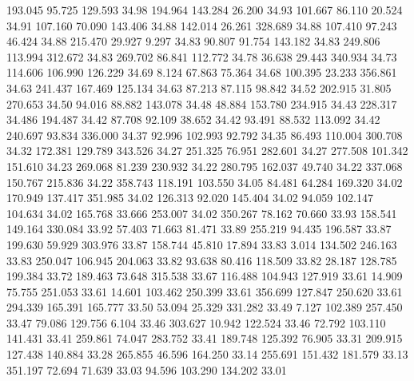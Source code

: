  193.045   95.725  129.593        34.98
 194.964  143.284   26.200        34.93
 101.667   86.110   20.524        34.91
 107.160   70.090  143.406        34.88
 142.014   26.261  328.689        34.88
 107.410   97.243   46.424        34.88
 215.470   29.927    9.297        34.83
  90.807   91.754  143.182        34.83
 249.806  113.994  312.672        34.83
 269.702   86.841  112.772        34.78
  36.638   29.443  340.934        34.73
 114.606  106.990  126.229        34.69
   8.124   67.863   75.364        34.68
 100.395   23.233  356.861        34.63
 241.437  167.469  125.134        34.63
  87.213   87.115   98.842        34.52
 202.915   31.805  270.653        34.50
  94.016   88.882  143.078        34.48
  48.884  153.780  234.915        34.43
 228.317   34.486  194.487        34.42
  87.708   92.109   38.652        34.42
  93.491   88.532  113.092        34.42
 240.697   93.834  336.000        34.37
  92.996  102.993   92.792        34.35
  86.493  110.004  300.708        34.32
 172.381  129.789  343.526        34.27
 251.325   76.951  282.601        34.27
 277.508  101.342  151.610        34.23
 269.068   81.239  230.932        34.22
 280.795  162.037   49.740        34.22
 337.068  150.767  215.836        34.22
 358.743  118.191  103.550        34.05
  84.481   64.284  169.320        34.02
 170.949  137.417  351.985        34.02
 126.313   92.020  145.404        34.02
  94.059  102.147  104.634        34.02
 165.768   33.666  253.007        34.02
 350.267   78.162   70.660        33.93
 158.541  149.164  330.084        33.92
  57.403   71.663   81.471        33.89
 255.219   94.435  196.587        33.87
 199.630   59.929  303.976        33.87
 158.744   45.810   17.894        33.83
   3.014  134.502  246.163        33.83
 250.047  106.945  204.063        33.82
  93.638   80.416  118.509        33.82
  28.187  128.785  199.384        33.72
 189.463   73.648  315.538        33.67
 116.488  104.943  127.919        33.61
  14.909   75.755  251.053        33.61
  14.601  103.462  250.399        33.61
 356.699  127.847  250.620        33.61
 294.339  165.391  165.777        33.50
  53.094   25.329  331.282        33.49
   7.127  102.389  257.450        33.47
  79.086  129.756    6.104        33.46
 303.627   10.942  122.524        33.46
  72.792  103.110  141.431        33.41
 259.861   74.047  283.752        33.41
 189.748  125.392   76.905        33.31
 209.915  127.438  140.884        33.28
 265.855   46.596  164.250        33.14
 255.691  151.432  181.579        33.13
 351.197   72.694   71.639        33.03
  94.596  103.290  134.202        33.01
